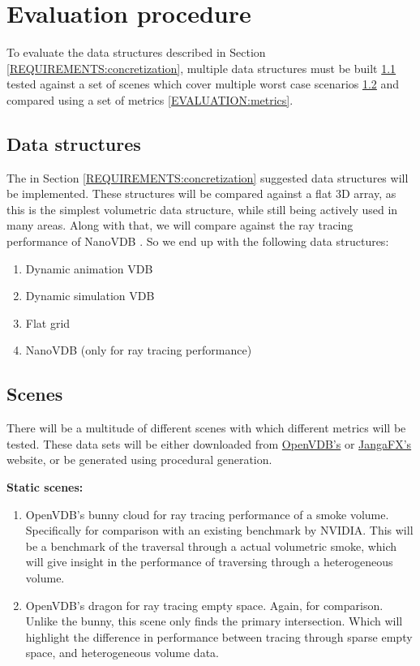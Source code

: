 \section{Evaluation procedure}\label{EVALUATION}
To evaluate the data structures described in Section \ref{REQUIREMENTS:concretization}, multiple data structures must be built \ref{EVALUATION:data_structures} tested against a set of scenes which cover multiple worst case scenarios \ref{EVALUATION:scenes} and compared using a set of metrics \ref{EVALUATION:metrics}.

\subsection{Data structures}\label{EVALUATION:data_structures}
The in Section \ref{REQUIREMENTS:concretization} suggested data structures will be implemented. These structures will be compared against a flat 3D array, as this is the simplest volumetric data structure, while still being actively used in many areas. Along with that, we will compare against the ray tracing performance of NanoVDB \cite{NanoVDBBenchmark}. So we end up with the following data structures:
\begin{enumerate}
    \item Dynamic animation VDB
    \item Dynamic simulation VDB
    \item Flat grid
    \item NanoVDB (only for ray tracing performance)
\end{enumerate}


\subsection{Scenes}\label{EVALUATION:scenes}
There will be a multitude of different scenes with which different metrics will be tested. These data sets will be either downloaded from \href{https://www.openvdb.org/download/}{OpenVDB's} or \href{https://jangafx.com/software/embergen/download/free-vdb-animations/}{JangaFX's} website, or be generated using procedural generation.

\noindent\textbf{Static scenes:}
\begin{enumerate}[noitemsep,topsep=0pt,parsep=0pt,partopsep=0pt]
    \item OpenVDB's bunny cloud for ray tracing performance of a smoke volume. Specifically for comparison with an existing benchmark by NVIDIA. This will be a benchmark of the traversal through a actual volumetric smoke, which will give insight in the performance of traversing through a heterogeneous volume.
    \item OpenVDB's dragon for ray tracing empty space. Again, for comparison. Unlike the bunny, this scene only finds the primary intersection. Which will highlight the difference in performance between tracing through sparse empty space, and heterogeneous volume data.
\end{enumerate}

